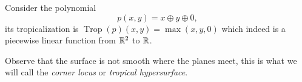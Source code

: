 \documentclass[12pt]{memoir}
\DeclareMathOperator{\Trop}{Trop}
\begin{document}
\begin{Ex}
    Consider the polynomial 
    $$p(x,y)=x\oplus y\oplus 0,$$
    its tropicalization is $\Trop(p)(x,y)=\max(x,y,0)$ which indeed is a piecewise linear function from $\mathbb{R}^2$ to $\mathbb{R}$.
    \begin{figure}[h!]
        \centering
        \quad
        \quad
        \label{fig:2.1-and-2.2-and-2.3}
    \end{figure}
    Observe that the surface is not smooth where the planes meet, this is what we will call the \emph{corner locus} or \emph{tropical hypersurface}.
\end{Ex}
\end{document}
